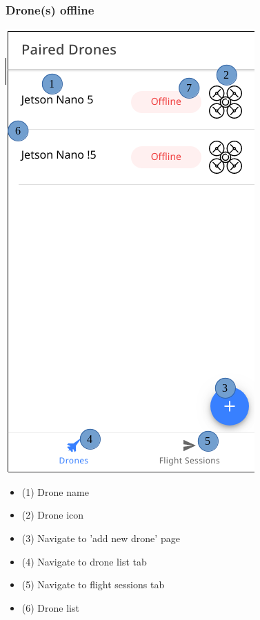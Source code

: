 \subsubsection{Drone(s) offline}
\begin{minipage}[c]{0.5\linewidth}
	\centering
	\includegraphics[scale=0.5]{./assets/images/offline.png}
	\label{fig: mainPageOffline}
\end{minipage}
\begin{minipage}[c]{0.5\linewidth}
	\begin{itemize}
		\item (1) Drone name
		\item (2) Drone icon
		\item (3) Navigate to 'add new drone' page
		\item (4) Navigate to drone list tab
		\item (5) Navigate to flight sessions tab
		\item (6) Drone list
	\end{itemize}
\end{minipage}

